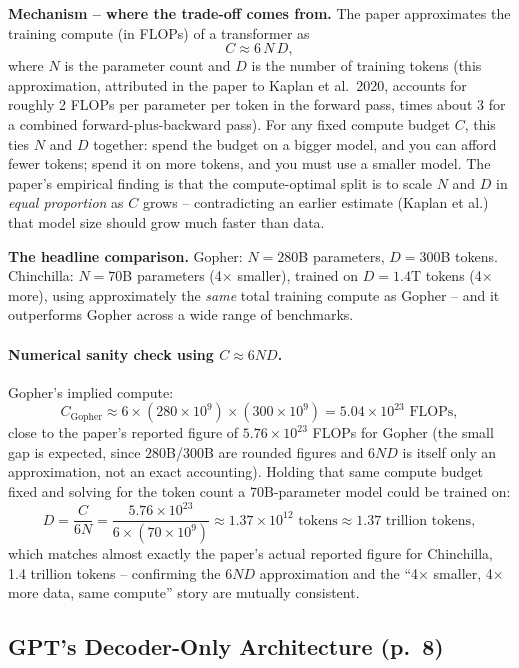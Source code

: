 \documentclass[11pt]{article}
\begin{document}
\textbf{Mechanism -- where the trade-off comes from.} The paper approximates the training compute (in FLOPs) of a transformer as
\[
C \approx 6\,N\,D,
\]
where $N$ is the parameter count and $D$ is the number of training tokens (this approximation, attributed in the paper to Kaplan et al.\ 2020, accounts for roughly 2 FLOPs per parameter per token in the forward pass, times about 3 for a combined forward-plus-backward pass). For any fixed compute budget $C$, this ties $N$ and $D$ together: spend the budget on a bigger model, and you can afford fewer tokens; spend it on more tokens, and you must use a smaller model. The paper's empirical finding is that the compute-optimal split is to scale $N$ and $D$ in \emph{equal proportion} as $C$ grows -- contradicting an earlier estimate (Kaplan et al.) that model size should grow much faster than data.

\textbf{The headline comparison.} Gopher: $N=280$B parameters, $D=300$B tokens. Chinchilla: $N=70$B parameters (4$\times$ smaller), trained on $D=1.4$T tokens (4$\times$ more), using approximately the \emph{same} total training compute as Gopher -- and it outperforms Gopher across a wide range of benchmarks.

\paragraph{Numerical sanity check using $C\approx 6ND$.} Gopher's implied compute:
\[
C_{\text{Gopher}} \approx 6 \times (280\times10^{9}) \times (300\times10^{9}) = 5.04\times10^{23}\text{ FLOPs},
\]
close to the paper's reported figure of $5.76\times10^{23}$ FLOPs for Gopher (the small gap is expected, since $280$B/$300$B are rounded figures and $6ND$ is itself only an approximation, not an exact accounting). Holding that same compute budget fixed and solving for the token count a 70B-parameter model could be trained on:
\[
D = \frac{C}{6N} = \frac{5.76\times10^{23}}{6\times(70\times10^{9})} \approx 1.37\times10^{12}\text{ tokens} \approx 1.37\text{ trillion tokens},
\]
which matches almost exactly the paper's actual reported figure for Chinchilla, 1.4 trillion tokens -- confirming the $6ND$ approximation and the ``4$\times$ smaller, 4$\times$ more data, same compute'' story are mutually consistent.

\subsection{GPT's Decoder-Only Architecture (p.\ 8)}
\end{document}
